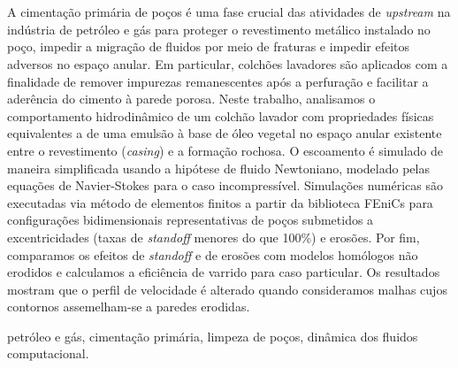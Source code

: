 \newpage

\section*{} 

\noindent
A cimentação primária de poços é uma fase crucial das atividades de \textit{upstream} na indústria de petróleo e gás para proteger o revestimento metálico instalado no poço, impedir a migração de fluidos por meio de fraturas e impedir efeitos adversos no espaço anular. Em particular, colchões lavadores são aplicados com a finalidade de remover impurezas remanescentes após a perfuração e  facilitar a aderência do cimento à parede porosa. Neste trabalho, analisamos o comportamento hidrodinâmico de um colchão lavador com propriedades físicas equivalentes a de uma emulsão à base de óleo vegetal no espaço anular existente entre o revestimento (\textit{casing}) e a formação rochosa. O escoamento é simulado de maneira simplificada usando a hipótese de fluido Newtoniano, modelado pelas equações de Navier-Stokes para o caso incompressível. Simulações numéricas são executadas via método de elementos finitos a partir da biblioteca FEniCs para configurações bidimensionais representativas de poços submetidos a excentricidades (taxas de \textit{standoff} menores do que 100\%) e erosões. Por fim, comparamos os efeitos de \textit{standoff} e de erosões com modelos homólogos não erodidos e calculamos a eficiência de varrido para caso particular. Os resultados mostram que o perfil de velocidade é alterado quando consideramos malhas cujos contornos assemelham-se a paredes erodidas.

\vspace{1cm}

petróleo e gás,
cimentação primária, 
limpeza de poços, 
dinâmica dos fluidos computacional.